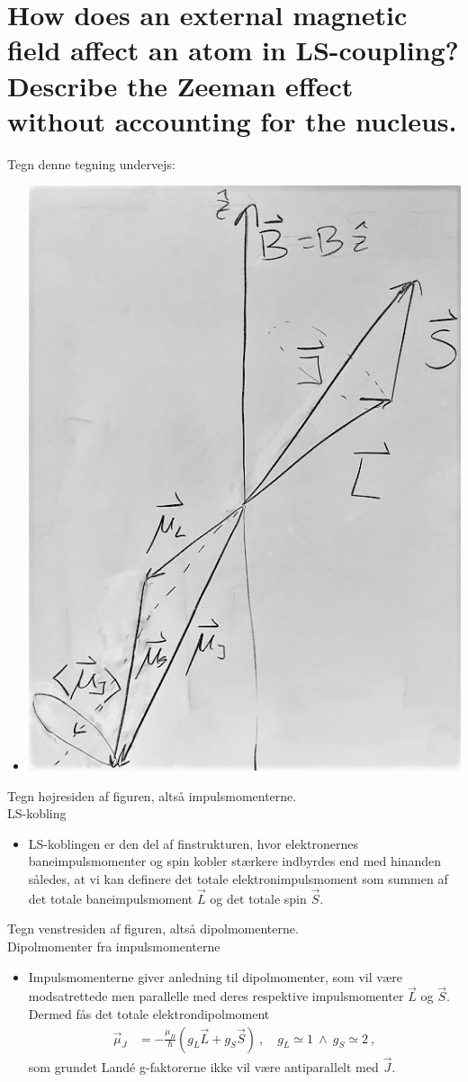 \section{How does an external magnetic field affect an atom in LS-coupling? Describe the Zeeman effect without accounting for the nucleus.}

\noindent
\large
Tegn denne tegning undervejs:
\begin{itemize}
    \item \includegraphics[width=.6\textwidth]{Q15/images/ZeemanEffectWithLSCouplingOwnDrawing.png}
\end{itemize}
%
\normalsize{Tegn højresiden af figuren, altså impulsmomenterne.}\large\\
LS-kobling
\begin{itemize}
    \item LS-koblingen er den del af finstrukturen, hvor elektronernes baneimpulsmomenter og spin kobler stærkere indbyrdes end med hinanden således, at vi kan definere det totale elektronimpulsmoment som summen af det totale baneimpulsmoment $\Vec{L}$ og det totale spin $\Vec{S}$.
\end{itemize}
%
\normalsize{Tegn venstresiden af figuren, altså dipolmomenterne.}\large\\
Dipolmomenter fra impulsmomenterne
\begin{itemize}
    \item Impulsmomenterne giver anledning til dipolmomenter, som vil være modsatrettede men parallelle med deres respektive impulsmomenter $\Vec{L}$ og $\Vec{S}$. Dermed fås det totale elektrondipolmoment
    \begin{align*}
        \Vec{\mu}_J &= -\frac{\mu_B}{\hbar}\left(g_L \Vec{L} + g_S \Vec{S}\right) \: , \quad g_L \simeq 1\: \wedge \ g_S \simeq 2 \: ,
    \end{align*}
    som grundet Landé g-faktorerne ikke vil være antiparallelt med $\Vec{J}$.
\end{itemize}
